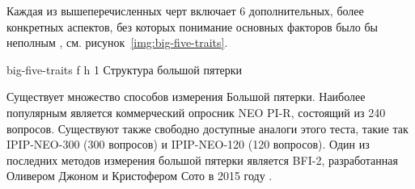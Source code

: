 Каждая из вышеперечисленных черт включает 6 дополнительных, более конкретных аспектов, без которых понимание основных факторов было бы неполным \cite{big_five_traits}, см. рисунок~\ref{img:big-five-traits}.

{big-five-traits} %
{f} %
{h} %
{1\textwidth} %
{Структура большой пятерки} %

Существует множество способов измерения Большой пятерки. Наиболее популярным является коммерческий опросник NEO PI-R, состоящий из 240 вопросов. Существуют также свободно доступные аналоги этого теста, такие так IPIP-NEO-300 (300 вопросов) и IPIP-NEO-120 (120 вопросов). Один из последних методов измерения большой пятерки является BFI-2, разработанная Оливером Джоном и Кристофером Сото в 2015 году \cite{big_five_inventory}.